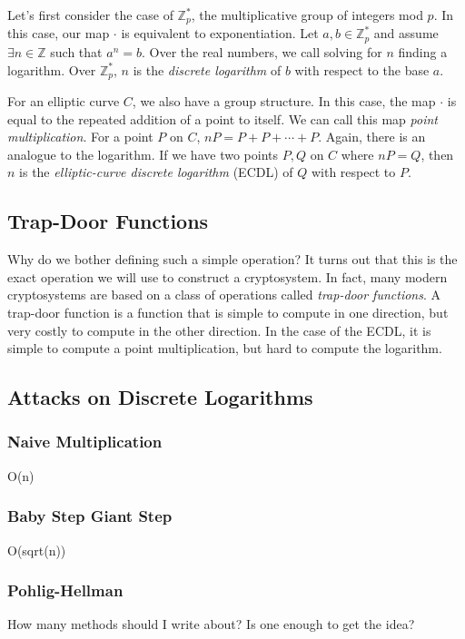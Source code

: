 \documentclass{article}
\begin{document}
Let's first consider the case of $\mathbb{Z}_p^*$, the multiplicative group of integers mod $p$.
In this case, our map $\cdot$ is equivalent to exponentiation.
Let $a,b \in \mathbb{Z}_p^*$ and assume $\exists n \in \mathbb{Z}$ such that $a^n = b$.
Over the real numbers, we call solving for $n$ finding a logarithm. Over $\mathbb{Z}_p^*$, $n$ is the \textit{discrete logarithm} of $b$ with respect to the base $a$.

For an elliptic curve $C$, we also have a group structure. 
In this case, the map $\cdot$ is equal to the repeated addition of a point to itself. 
We can call this map \textit{point multiplication}.
For a point $P$ on $C$, $nP = P + P + \cdots + P$.
Again, there is an analogue to the logarithm.
If we have two points $P,Q$ on $C$ where $nP = Q$, then $n$ is the \textit{elliptic-curve discrete logarithm} (ECDL) of $Q$ with respect to $P$.

\subsection{Trap-Door Functions}
Why do we bother defining such a simple operation?
It turns out that this is the exact operation we will use to construct a cryptosystem.
In fact, many modern cryptosystems are based on a class of operations called \textit{trap-door functions}.
A trap-door function is a function that is simple to compute in one direction, but very costly to compute in the other direction.
In the case of the ECDL, it is simple to compute a point multiplication, but hard to compute the logarithm.

\subsection{Attacks on Discrete Logarithms}

\subsubsection{Naive Multiplication}
O(n)

\subsubsection{Baby Step Giant Step}
O(sqrt(n))

\subsubsection{Pohlig-Hellman}
How many methods should I write about? Is one enough to get the idea?
\end{document}
